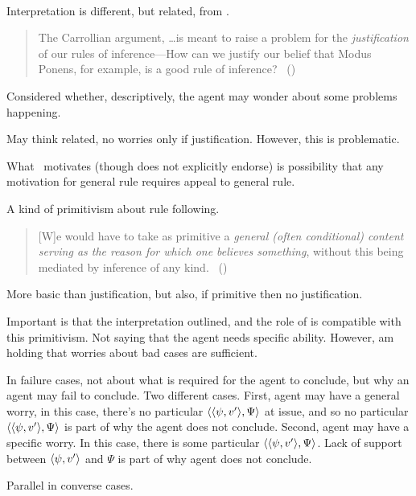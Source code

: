 \paragraph{\textcite{Boghossian:2008vf}}

\begin{note}
  Interpretation is different, but related, from \textcite{Boghossian:2008vf}.

  \begin{quote}
    The Carrollian argument, \dots is meant to raise a problem for the \emph{justification} of our rules of inference---How can we justify our belief that Modus Ponens, for example, is a good rule of inference?\newline
    \mbox{ }\hfill\mbox{(\citeyear[493]{Boghossian:2008vf})}
  \end{quote}

  Considered whether, descriptively, the agent may wonder about some problems happening.

  May think related, no worries only if justification.
  However, this is problematic.

  What~\cite{Boghossian:2008vf} motivates (though does not explicitly endorse) is possibility that any motivation for general rule requires appeal to general rule.

  A kind of primitivism about rule following.
  \begin{quote}
    [W]e would have to take as primitive a \emph{general (often conditional) content serving as the reason for which one believes something}, without this being mediated by inference of any kind.%
    \mbox{ }\hfill\mbox{(\citeyear[500]{Boghossian:2008vf})}
  \end{quote}

  More basic than justification, but also, if primitive then no justification.

  Important is that the interpretation outlined, and the role of \qzS{} is compatible with this primitivism.
  Not saying that the agent needs specific ability.
  However, am holding that worries about bad cases are sufficient.

  In failure cases, not about what is required for the agent to conclude, but why an agent may fail to conclude.
  Two different cases.
  First, agent may have a general worry, in this case, there's no particular \(\langle \langle \psi, v' \rangle, \Psi \rangle\) at issue, and so no particular \(\langle \langle \psi, v' \rangle, \Psi \rangle\) is part of why the agent does not conclude.
  Second, agent may have a specific worry.
  In this case, there is some particular \(\langle \langle \psi, v' \rangle, \Psi \rangle\).
  Lack of support between \(\langle \psi, v' \rangle\) and \(\Psi\) is part of why agent does not conclude.

  Parallel in converse cases.
\end{note}



